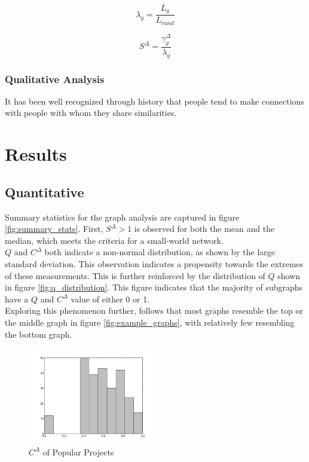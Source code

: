 \documentclass{proc}
\begin{document}
\[\lambda_g = \frac{L_g }{L_{rand} } \]

\[S^\Delta = \frac{\gamma^{\Delta}_g }{\lambda_g} \]


\subsubsection{Qualitative Analysis}
It has been well recognized through history that people tend to make connections with people with whom they share similarities\cite{mcpherson2001birds}.
 
\section{Results}

\subsection{Quantitative}



Summary statistics for the graph analysis are captured in figure \ref{fig:summary_stats}. First, $S^\Delta > 1$ is observed for both the mean and the median, which meets the criteria for a small-world network\cite{humphries2008network}.\\

$Q$ and $C^\Delta$ both indicate a non-normal distribution, as shown by the large standard deviation. This observation indicates a propensity towards the extremes of these measurements. This is further reinforced by the distribution of $Q$ shown in figure \ref{fig:q_distribution}. This figure indicates that the majority of subgraphs have a $Q$ and $C^\Delta$ value of either 0 or 1.\\

Exploring this phenomenon further, follows that most graphs resemble the top or the middle graph in figure \ref{fig:example_graphs}, with relatively few resembling the bottom graph.


\begin{figure}
\label{fig:cc_popular}
\begin{center}
\caption{$C^\Delta$ of Popular Projects}
\includegraphics[width=0.5\textwidth]{images/freecode-popular.png}
\end{center}
\end{figure}
\end{document}
